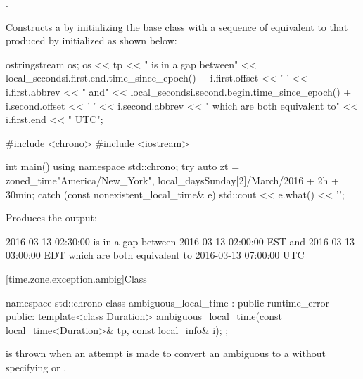 \begin{itemdescr}
\pnum
\requires {}.

\pnum
\effects
Constructs a 
by initializing the base class with a sequence of 
equivalent to that produced by 
initialized as shown below:

\begin{codeblock}
ostringstream os;
os << tp << " is in a gap between\n"
   << local_seconds{i.first.end.time_since_epoch()} + i.first.offset << ' '
   << i.first.abbrev << " and\n"
   << local_seconds{i.second.begin.time_since_epoch()} + i.second.offset << ' '
   << i.second.abbrev
   << " which are both equivalent to\n"
   << i.first.end << " UTC";
\end{codeblock}

\pnum
\begin{example}
\begin{codeblock}
#include <chrono>
#include <iostream>

int main() {
  using namespace std::chrono;
  try {
    auto zt = zoned_time{"America/New_York",
                         local_days{Sunday[2]/March/2016} + 2h + 30min};
  } catch (const nonexistent_local_time& e) {
    std::cout << e.what() << '\n';
  }
}
\end{codeblock}

Produces the output:

\begin{outputblock}
2016-03-13 02:30:00 is in a gap between
2016-03-13 02:00:00 EST and
2016-03-13 03:00:00 EDT which are both equivalent to
2016-03-13 07:00:00 UTC
\end{outputblock}
\end{example}
\end{itemdescr}

[time.zone.exception.ambig]{Class }

\begin{codeblock}
namespace std::chrono {
  class ambiguous_local_time : public runtime_error {
  public:
    template<class Duration>
      ambiguous_local_time(const local_time<Duration>& tp, const local_info& i);
  };
}
\end{codeblock}

\pnum
{} is thrown when
an attempt is made
to convert an ambiguous  to a 
without specifying  or .

